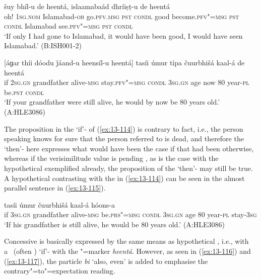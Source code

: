 \begin{exe}
\ex
\label{ex:13-113}
 šuy bhíl-u de heentá,
islaamabaád  dhríiṣṭ-u de heentá \\
oh! \textsc{1sg.nom} Islamabad-\textsc{ob} go.\textsc{pfv.msg} \textsc{pst}  \textsc{condl} good become.\textsc{pfv"=msg} \textsc{pst} \textsc{condl} Islamabad see.\textsc{pfv"=msg} \textsc{pst} \textsc{condl} \\
\glt `If only I had gone to Islamabad, it would have been good, I would have seen Islamabad.' (B:ISH001-2)

\ex
\label{ex:13-114}
\gll \label{bkm:Ref190830564}[áɡar thíi dóodu ǰáand-u heensíl-u  heentá]
tasíi úmur típa čuurbhišá kaal-á de  heentá \\
if \textsc{2sg.gn} grandfather alive-\textsc{msg} stay.\textsc{pfv"=msg}  \textsc{condl} 
\textsc{3sg.gn} age now 80 year-\textsc{pl} be.\textsc{pst} \textsc{condl} \\
\glt `If your grandfather were still alive, he would by now be 80 years old.' (A:HLE3086) 
\end{exe}

The proposition in the `if'- of (\ref{ex:13-114}) is contrary to fact, i.e., the person speaking knows for sure that the person referred to is dead, and therefore the `then'- here expresses what would have been the case if that had been otherwise, whereas if the verisimilitude value is pending \citep[332]{givon2001b}, as is the case with the hypothetical  exemplified already, the proposition of the `then'- may still be true. A hypothetical  contrasting with the  in (\ref{ex:13-114}) can be seen in the almost parallel sentence in (\ref{ex:13-115}).

\begin{exe}
\ex
\label{ex:13-115}
 tasíi úmur čuurbhišá kaal-á hóons-a \\
if \textsc{3sg.gn} grandfather alive-\textsc{msg} be.\textsc{prs"=msg}  \textsc{condl} \textsc{3sg.gn} age 80 year-\textsc{pl} stay-\textsc{3sg} \\
\glt `If his grandfather is still alive, he would be 80 years old.' (A:HLE3086) 
\end{exe}

 Concessive  is basically expressed by the same means as hypothetical , i.e., with a~ (often ) `if'- with the "=marker \textit{heentá}. However, as seen in (\ref{ex:13-116}) and (\ref{ex:13-117}), the particle \textit{bi} `also, even' is added to emphasise the contrary"=to"=expectation reading. 

